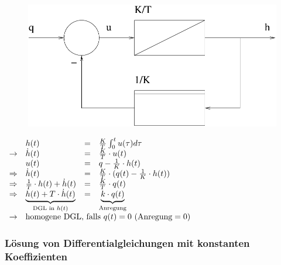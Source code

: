 \documentclass[12pt,a4paper,ngerman]{scrartcl}
\begin{document}
   \begin{figure}[H]
     \centering
     \includegraphics[width=.5\linewidth]{sysregel_bsb6}
   \end{figure}
   \begin{math}
     \begin{array}{llll}
       &h(t)&=&\frac{K}{T}\int_0^t{u(\tau)d\tau}\\
     \rightarrow&\dot{h}(t)&=&\frac{K}{T}\cdot u(t)\\
     &u(t)&=&q-\frac{1}{K}\cdot h(t)\\
     \Rightarrow&\dot{h}(t)&=&\frac{K}{T}\cdot (q(t)-\frac{1}{K} \cdot{h}(t))\\
     \Rightarrow&\frac{1}{T}\cdot h(t)+\dot{h}(t)&=&\frac{K}{T}\cdot q(t)\\
     \Rightarrow&\underbrace{h(t)+T\cdot \dot{h}(t)}_{\text{DGL in }h(t)}&=&\underbrace{k\cdot q(t)}_{\text{Anregung}}\\

     \rightarrow& \multicolumn{3}{l}{\text{homogene DGL, falls }q(t)=0 \text{ (Anregung}=0)}
   \end{array}
  \end{math}

  \subsubsection{Lösung von Differentialgleichungen mit konstanten Koeffizienten}
\end{document}

